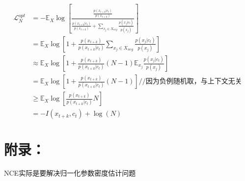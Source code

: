\documentclass{article}
\begin{document}
\begin{equation}
    \begin{split}
        \mathcal{L}_N^{opt} &= - \mathbb{E}_{X} \log [\frac{\frac{p(x_{t+k}|c_t)}{p(x_{t+k})}}{\frac{p(x_{t+k}|c_t)}{p(x_{t+k})} + \sum_{x_j \in X_{neg}} \frac{p(x_j|c_t)}{p(x_j)} }] \\
        &= \mathbb{E}_{X} \log [1+ \frac{p(x_{t+k})}{p(x_{t+k}|c_t)} \sum_{x_j \in X_{neg}} \frac{p(x_j|c_t)}{p(x_j)}] \\
        &\approx \mathbb{E}_X \log [1+ \frac{p(x_{t+k})}{p(x_{t+k}|c_t)} (N-1) \mathbb{E}_{x_j}\frac{p(x_j|c_t)}{p(x_j)}] \\
        &=  \mathbb{E}_X \log [1+ \frac{p(x_{t+k})}{p(x_{t+k}|c_t)} (N-1)] // \textbf{因为负例随机取，与上下文无关}\\
        &\ge \mathbb{E}_X \log [\frac{p(x_{t+k})}{p(x_{t+k}|c_t)} N]\\
        &= -I(x_{t+k},c_t)+ \log(N)
    \end{split}
\end{equation}

\section{附录：}
NCE实际是要解决归一化参数密度估计问题



\end{document}
